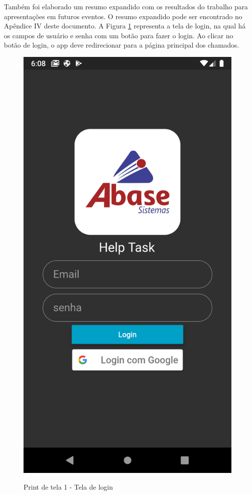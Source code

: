 Também foi elaborado um resumo expandido com os resultados do trabalho para apresentações em futuros eventos. O resumo expandido pode ser encontrado no Apêndice IV deste documento.
\newpage
A Figura \ref{fig:1_login} representa a tela de login, na qual há os campos de usuário e senha com um botão para fazer o login. Ao clicar no botão de login, o app deve redirecionar para a página principal dos chamados.
\begin{figure}[htb]
     \caption{Print de tela 1 - Tela de login}
     \centering
     \begin{frame}{
     \includegraphics [scale = 0.2]{img/screenshots/1_login.png}}
     \end{frame}
     \label{fig:1_login}
 \end{figure}
\newpage

